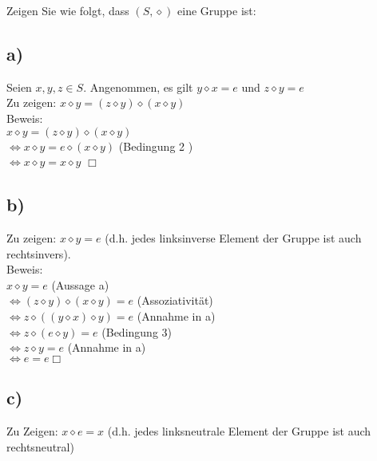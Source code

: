 \documentclass[paper = a4, ngerman]{scrartcl}
\begin{document}
Zeigen Sie wie folgt, dass $(S, \diamond)$ eine Gruppe ist:

\subsection*{a)}
Seien $x,y,z \in S$. Angenommen, es gilt $y \diamond x = e $ und  $z \diamond y = e$\\
Zu zeigen: $x \diamond y = (z \diamond y) \diamond (x \diamond y)$\\

Beweis:\\
$x \diamond y = (z \diamond y) \diamond (x \diamond y)$\\
$\Leftrightarrow x \diamond y = e \diamond (x \diamond y)$ \hspace{10mm} (Bedingung 2 ) \\
$\Leftrightarrow x \diamond y = x \diamond y$	\hfill$\Box$\\

\subsection*{b)}
Zu zeigen: $x \diamond y = e$ (d.h. jedes linksinverse Element der Gruppe ist auch rechtsinvers).\\

Beweis:\\
$x \diamond y = e$ \hspace{10mm} (Aussage a)\\
$\Leftrightarrow (z \diamond y) \diamond (x \diamond y) = e$ \hspace{10mm} (Assoziativität)\\
$\Leftrightarrow z \diamond ((y \diamond x) \diamond y) = e$ \hspace{10mm} (Annahme in a)\\
$\Leftrightarrow z \diamond (e \diamond y) = e$ \hspace{10mm} (Bedingung 3)\\
$\Leftrightarrow z \diamond y = e$ \hspace{10mm} (Annahme in a)\\
$\Leftrightarrow e = e$\hfill$\Box$\\

\subsection*{c)}
Zu Zeigen: $x \diamond e = x$ (d.h. jedes linksneutrale Element der Gruppe ist auch rechtsneutral)\\
\end{document}
